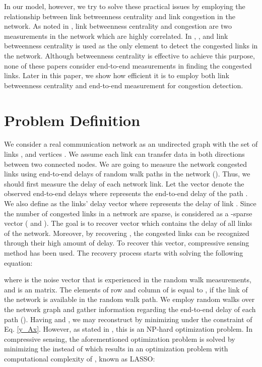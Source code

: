 \documentclass{article}
\begin{document}
In our model, however, we try to solve these practical issues by employing the relationship between link betweenness centrality and link congestion in the network. As noted in \cite{BC1}, link betweenness centrality and congestion are two measurements in the network which are highly correlated. In  \cite{BC1}, \cite{BC2}, and \cite{BC3} link betweenness centrality is used as the only element to detect the congested links in the network. Although betweenness centrality is effective to achieve this purpose, none of these papers consider end-to-end measurements in finding the congested links. Later in this paper, we show  how efficient it is to employ both link betweenness centrality and end-to-end measurement for congestion detection.

\section{Problem Definition}
\label{Problem Definition}
We consider a real communication network as an undirected graph with the set of links , and vertices . We assume each link can transfer data in both directions between two connected nodes. We are going to measure the network congested links using end-to-end delays of  random walk paths in the network (). Thus, we should first measure the delay of each network link. Let the vector  denote the observed end-to-end delays where  represents the end-to-end delay of the path . We also define  as the links' delay vector where  represents the delay of link . Since the number of congested links in a network are sparse,  is considered as a -sparse vector ( and ). The goal is to recover vector  which contains the delay of all  links of the network. Moreover, by recovering , the congested links can be recognized through their high amount of delay. To recover this vector, compressive sensing method has been used. The recovery process starts with solving the following equation: 

where  is the noise vector that is experienced in the random walk measurements, and  is an  matrix. The elements of  row and  column of  is equal to , if the  link of the network is available in the  random walk path. We employ  random walks over the network graph and gather information regarding the end-to-end delay of each path (). Having  and , we may reconstruct  by minimizing 
under the constraint of Eq. \eqref{y_Ax}. However, as stated in \cite{l0norm}, this is an NP-hard optimization problem. In compressive sensing, the aforementioned optimization problem is solved by minimizing the 
 instead of 
which results in an optimization problem with computational complexity of  \cite{l0norm}, known as LASSO: 
\end{document}
